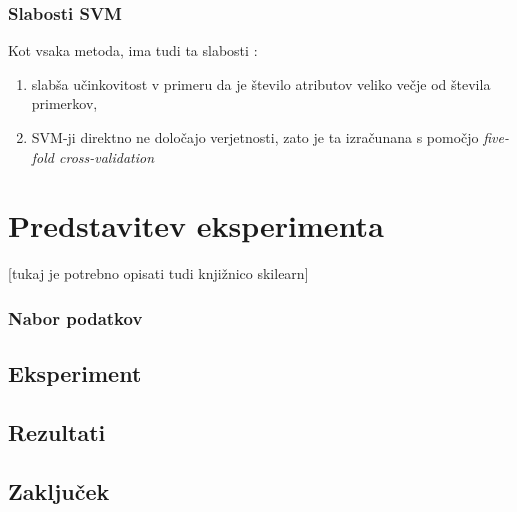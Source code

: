 \documentclass[a4paper,11pt]{article}
\begin{document}
\begin{multicols}{2}
\subsubsection{Slabosti SVM}
Kot vsaka metoda, ima tudi ta slabosti \cite{SciDev}:
\begin{enumerate}
\item{slabša učinkovitost v primeru da je število atributov veliko večje od števila primerkov,}
\item{SVM-ji direktno ne določajo verjetnosti, zato je ta izračunana s pomočjo \textit{five-fold cross-validation}}
\end{enumerate}


\section{Predstavitev eksperimenta}
[tukaj je potrebno opisati tudi knjižnico skilearn]
\subsubsection{Nabor podatkov}


\subsection{Eksperiment}


\subsection{Rezultati}


\subsection{Zaključek}


\end{multicols}

\normalsize
\newpage

\begin{multicols}{2}


{}


\end{multicols}
\end{document}
